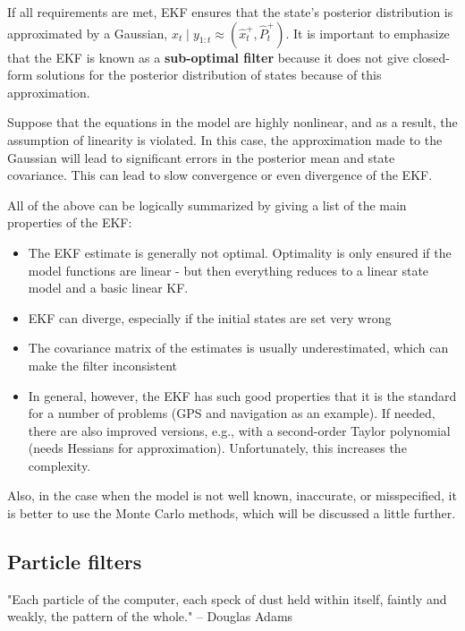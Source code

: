If all requirements are met, EKF ensures that the state's posterior distribution is approximated by a Gaussian, \(x_t \mid y_{1:t} \approx (\hat{x}^{+}_t,\hat{P}^{+}_t)\). It is important to emphasize that the EKF is known as a \textbf{sub-optimal filter} because it does not give closed-form solutions for the posterior distribution of states because of this approximation. 

Suppose that the equations in the model are highly nonlinear, and as a result, the assumption of linearity is violated. In this case, the approximation made to the Gaussian will lead to significant errors in the posterior mean and state covariance. This can lead to slow convergence or even divergence of the EKF.

All of the above can be logically summarized by giving a list of the main properties of the EKF:
\begin{itemize}
    \item The EKF estimate is generally not optimal. Optimality is only ensured if the model functions are linear - but then everything reduces to a linear state model and a basic linear KF.
    \item EKF can diverge, especially if the initial states are set very wrong
    \item The covariance matrix of the estimates is usually underestimated, which can make the filter inconsistent
    \item In general, however, the EKF has such good properties that it is the standard for a number of problems (GPS and navigation as an example). If needed, there are also improved versions, e.g., with a second-order Taylor polynomial (needs Hessians for approximation). Unfortunately, this increases the complexity.
\end{itemize}

Also, in the case when the model is not well known, inaccurate, or misspecified, it is better to use the Monte Carlo methods, which will be discussed a little further.

\subsection{Particle filters}

\begin{displayquote}
"Each particle of the computer, each speck of dust
held within itself, faintly and weakly, the pattern of the whole." – Douglas Adams
\end{displayquote}


